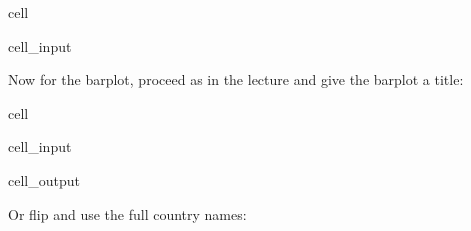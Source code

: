 \documentclass[letterpaper,10pt,english]{jupyterBook}
\begin{document}
\begin{sphinxuseclass}{cell}\begin{sphinxVerbatimInput}

\begin{sphinxuseclass}{cell_input}
\begin{sphinxVerbatim}[commandchars=\\\{\}]
\end{sphinxVerbatim}

\end{sphinxuseclass}\end{sphinxVerbatimInput}

\end{sphinxuseclass}
\sphinxAtStartPar
Now for the barplot, proceed as in the lecture and give the barplot a title:

\begin{sphinxuseclass}{cell}\begin{sphinxVerbatimInput}

\begin{sphinxuseclass}{cell_input}
\begin{sphinxVerbatim}[commandchars=\\\{\}]
\end{sphinxVerbatim}

\end{sphinxuseclass}\end{sphinxVerbatimInput}
\begin{sphinxVerbatimOutput}

\begin{sphinxuseclass}{cell_output}
\noindent{}

\end{sphinxuseclass}\end{sphinxVerbatimOutput}

\end{sphinxuseclass}
\sphinxAtStartPar
Or flip and use the full country names:
\end{document}
